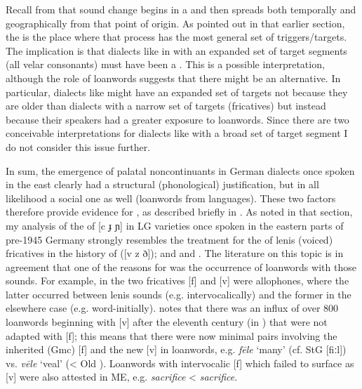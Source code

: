 Recall from  that sound change begins in a  and then spreads both temporally and geographically from that point of origin. As pointed out in that earlier section, the  is the place where that process has the most general set of triggers/targets. The implication is that dialects like  in  with an expanded set of target segments (all velar consonants) must have been a . This is a possible interpretation, although the role of loanwords suggests that there might be an alternative. In particular, dialects like  might have an expanded set of targets not because they are older than dialects with a narrow set of targets (fricatives) but instead because their speakers had a greater exposure to loanwords. Since there are two conceivable interpretations for dialects like  with a broad set of target segment I do not consider this issue further.\largerpage

In sum, the emergence of palatal noncontinuants in German dialects once spoken in the east clearly had a structural (phonological) justification, but in all likelihood a social one as well (loanwords from  languages). These two factors therefore provide evidence for , as described briefly in . As noted in that section, my analysis of the  of [c ɟ ɲ] in LG varieties once spoken in the eastern parts of pre-1945 Germany strongly resembles the treatment for the  of lenis (voiced) fricatives in the history of  ([v z ð]); \citet[142]{RingeEska2013} and \citet[91--93]{Minkova2014} and . The literature on this topic is in agreement that one of the reasons for  was the occurrence of  loanwords with those sounds. For example, in  the two fricatives [f] and [v] were allophones, where the latter occurred between lenis sounds (e.g. intervocalically) and the former in the elsewhere case (e.g. word-initially). \citet{Minkova2014} notes that there was an influx of over 800  loanwords beginning with [v] after the eleventh century (in ) that were not adapted with [f]; this means that there were now minimal pairs involving the inherited (Gmc) [f] and the new [v] in loanwords, e.g. \textit{fēle} ‘many’ (cf. StG [fiːl]) vs. \textit{vēle} ‘veal’ (< Old ). Loanwords with intervocalic [f] which failed to surface as [v] were also attested in ME, e.g. \textit{sacrifice} <  \textit{sacrifice}.

